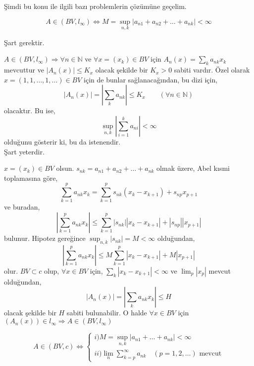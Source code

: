 Şimdi bu konu ile ilgili bazı problemlerin çözümüne geçelim.
\begin{prob}
$$
A\in(BV,l_\infty)\iff M=\sup_{n,k}|a_{n1}+a_{n2}+\ldots+a_{nk}|<\infty
$$
\end{prob}
\begin{coz}

Şart gerektir.

$A\in(BV,l_\infty)\Rightarrow\forall n\in\mathbb{N}$ ve $\forall x=(x_k)\in BV$ için $A_n(x)=\sum\limits_ka_{nk}x_k$ mevcuttur ve $|A_n(x)|\leq K_x$ olacak şekilde bir $K_x>0$ sabiti vardır. Özel olarak $x=(1,1,\ldots,1,\ldots)\in BV$ için de bunlar sağlanacağından, bu dizi için,
$$
|A_n(x)|=\left|\sum_ka_{nk}\right|\leq K_x\qquad(\forall n\in\mathbb{N})
$$
olacaktır. Bu ise,
$$
\sup_{n,k}\left|\sum\limits_{i=1}^ka_{ni}\right|<\infty
$$
olduğunu gösterir ki, bu da istenendir.\\[5pt]
Şart yeterdir.

$x=(x_k)\in BV$ olsun. $s_{nk}=a_{n1}+a_{n2}+\ldots+a_{nk}$ olmak üzere, Abel kısmi toplamasına göre,
$$
\sum\limits_{k=1}^pa_{nk}x_k=\sum\limits_{k=1}^ps_{nk}(x_k-x_{k+1})+s_{np}x_{p+1}
$$
ve buradan,
$$
\left|\sum\limits_{k=1}^pa_{nk}x_k\right|\leq\sum\limits_{k=1}^p|s_{nk}||x_k-x_{k+1}|+|s_{np}||x_{p+1}|
$$
bulunur. Hipotez gereğince $\sup_{n,k}|s_{nk}|=M<\infty$ olduğundan,
$$
\left|\sum\limits_{k=1}^pa_{nk}x_k\right|\leq M\sum\limits_{k=1}^p|x_k-x_{k+1}|+M|x_{p+1}|
$$
olur. $BV\subset c$ olup, $\forall x\in BV$ için, $\sum\limits_k|x_k-x_{k+1}|<\infty$ ve $\lim_p|x_p|$ mevcut olduğundan,
$$
|A_n(x)|=\left|\sum_ka_{nk}x_k\right|\leq H
$$
olacak şekilde bir $H$ sabiti bulunabilir. O halde $\forall x\in BV$ için $(A_n(x))\in l_\infty\Rightarrow A\in (BV,l_\infty)$
\end{coz}
\begin{prob}
$$
A\in (BV,c)\iff
\begin{cases}
i) M=\sup_{n,k}|a_{n1}+\ldots+a_{nk}|<\infty\\
ii) \lim_n\sum\limits_{k=p}^\infty a_{nk}\quad(p=1,2,\ldots)\text{ mevcut}
\end{cases}
$$
\end{prob}
